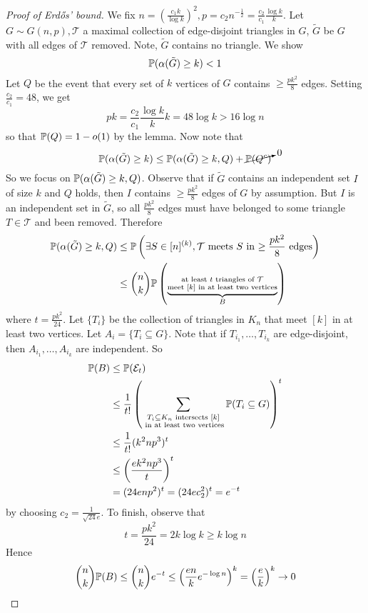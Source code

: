 \documentclass{article}
\begin{document}
\begin{proof}[Proof of Erd\H os' bound]
  We fix $n = \left(\frac{c_1 k}{\log k}\right)^2, p = c_2n^{-\frac 12} = \frac{c_2}{c_1}\frac{\log k}k$. Let $G \sim G(n, p), \mathcal T$ a maximal collection of edge-disjoint triangles in $G$, $\tilde G$ be $G$ with all edges of $\mathcal T$ removed. Note, $\tilde G$ contains no triangle. We show
  $$\P(\alpha(\tilde G) \ge k) < 1$$
  Let $Q$ be the event that every set of $k$ vertices of $G$ contains $\ge \frac{pk^2}8$ edges. Setting $\frac{c_2}{c_1} = 48$, we get
  $$pk = \frac{c_2}{c_1}\frac{\log k}k k = 48\log k > 16\log n$$
  so that $\P(Q) = 1 - o(1)$ by the lemma. Now note that
  $$\P(\alpha(\tilde G) \ge k) \le \P(\alpha(\tilde G) \ge k, Q) + \cancelto 0{\P(Q^c)}$$
  So we focus on $\P(\alpha(\tilde G) \ge k, Q)$. Observe that if $\tilde G$ contains an independent set $I$ of size $k$ and $Q$ holds, then $I$ contains $\ge \frac{pk^2}8$ edges of $G$ by assumption. But $I$ is an independent set in $\tilde G$, so all $\frac{pk^2}8$ edges must have belonged to some triangle $T \in \mathcal T$ and been removed. Therefore
  \begin{align*}
    \P(\alpha(\tilde G) \ge k, Q)
    & \le \P\left(\exists S \in [n]^{(k)}, \mathcal T \text{ meets $S$ in $\ge \frac{pk^2}8$ edges}\right) \\
    & \le \binom n k \P\left(\underbrace{\substack{\text{at least $t$ triangles of $\mathcal T$} \\ \text{meet $[k]$ in at least two vertices}}}_B\right)
  \end{align*}
  where $t = \frac{pk^2}{24}$. Let $\{T_i\}$ be the collection of triangles in $K_n$ that meet $[k]$ in at least two vertices. Let $A_i = \{T_i \subseteq G\}$. Note that if $T_{i_1}, \dots, T_{i_k}$ are edge-disjoint, then $A_{i_1}, \dots, A_{i_k}$ are independent. So
  \begin{align*}
    \P(B)
    & \le \P(\Eps_t) \\
    & \le \frac 1{t!}\left(\sum_{\substack{T_i \subseteq K_n \text{ intersects } [k] \\ \text{ in at least two vertices}}} \P(T_i \subseteq G)\right)^t \\
    & \le \frac 1{t!} (k^2np^3)^t \\
    & \le \left(\frac{ek^2np^3}t\right)^t \\
    & = (24enp^2)^t = (24ec_2^2)^t = e^{-t}
  \end{align*}
  by choosing $c_2 = \frac 1{\sqrt{24} e}$. To finish, observe that
  $$t = \frac{pk^2}{24} = 2k\log k \ge k\log n$$
  Hence
  $$\binom n k \P(B) \le \binom n k e^{-t} \le \left(\frac{en}k e^{-\log n}\right)^k = \left(\frac ek\right)^k \to 0$$
\end{proof}
\end{document}
